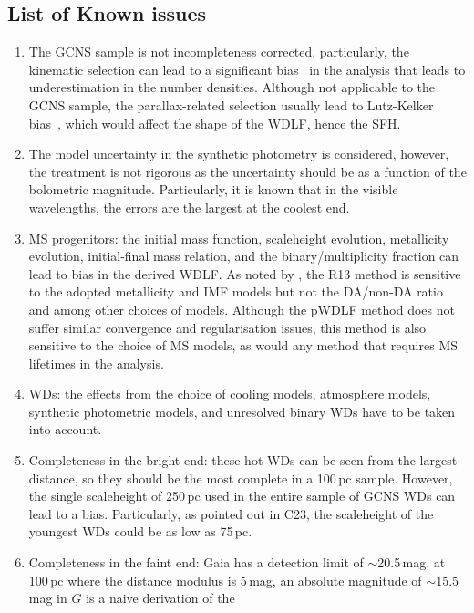 \documentclass[fleqn,usenatbib]{mnras}
\begin{document}
\subsection*{List of Known issues}
\begin{enumerate}
    \item The GCNS sample is not incompleteness corrected, particularly, the
    kinematic selection can lead to a significant 
    bias~\citep{2014ApJ...791...92T, 2015MNRAS.450.4098L} in the analysis that
    leads to underestimation in the number densities. Although not applicable to the GCNS
    sample, the parallax-related selection usually lead to Lutz-Kelker 
    bias~\citep{1973PASP...85..573L}, which would affect the shape of the
    WDLF, hence the SFH.
    \item The model uncertainty in the synthetic photometry is considered,
    however, the treatment is not rigorous as the uncertainty should be as
    a function of the bolometric magnitude. Particularly, it is known that
    in the visible wavelengths, the errors are the largest at the coolest end.
    \item MS progenitors: the initial mass function, scaleheight evolution,
    metallicity evolution, initial-final mass relation, and the
    binary/multiplicity fraction can lead to bias in the derived WDLF. As
    noted by \citet{2019ApJ...878L..11I}, the R13 method is sensitive to the
    adopted metallicity and IMF models but not the DA/non-DA ratio and among
    other choices of models. Although the pWDLF method does not suffer similar
    convergence and regularisation issues, this method is also sensitive to
    the choice of MS models, as would any method that requires MS lifetimes
    in the analysis.
    \item WDs: the effects from the choice of cooling models, atmosphere
    models, synthetic photometric models, and unresolved binary WDs have to be
    taken into account.
    \item Completeness in the bright end: these hot WDs can be seen from the
    largest distance, so they should be the most complete in a 100\,pc
    sample. However, the single scaleheight of 250\,pc used in the entire
    sample of GCNS WDs can lead to a bias. Particularly, as pointed out in
    C23, the scaleheight of the youngest WDs could be
    as low as 75\,pc.
    \item Completeness in the faint end: Gaia has a detection limit of
    $\sim$20.5\,mag, at 100\,pc where the distance modulus is 5\,mag, an
    absolute magnitude of $\sim$15.5\,mag in $G$ is a naive derivation of the

\end{enumerate}
\end{document}
